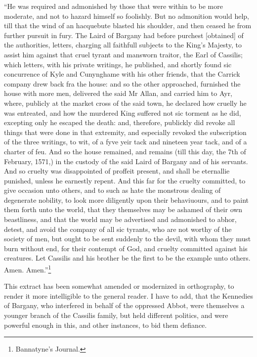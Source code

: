 ``He was required and admonished by those that were within to be more
moderate, and not to hazard himself so foolishly. But no admonition
would help, till that the wind of an hacquebute blasted his shoulder,
and then ceased he from further pursuit in fury. The Laird of Bargany
had before purchest {[}obtained{]} of the authorities, letters, charging
all faithfull subjects to the King's Majesty, to assist him against that
cruel tyrant and mansworn traitor, the Earl of Cassilis; which letters,
with his private writings, he published, and shortly found sic
concurrence of Kyle and Cunynghame with his other friends, that the
Carrick company drew back fra the house: and so the other approached,
furnished the house with more men, delivered the said Mr Allan, and
carried him to Ayr, where, publicly at the market cross of the said
town, he declared how cruelly he was entreated, and how the murdered
King suffered not sic torment as he did, excepting only he escaped the
death: and, therefore, publickly did revoke all things that were done in
that extremity, and especially revoked the subscription of the three
writings, to wit, of a fyve yeir tack and nineteen year tack, and of a
charter of feu. And so the house remained, and remains (till this day,
the 7th of February, 1571,) in the custody of the said Laird of Bargany
and of his servants. And so cruelty was disappointed of proffeit
present, and shall be eternallie punished, unless he earnestly repent.
And this far for the cruelty committed, to give occasion unto others,
and to such as hate the monstrous dealing of degenerate nobility, to
look more diligently upon their behaviuours, and to paint them forth
unto the world, that they themselves may be ashamed of their own
beastliness, and that the world may be advertised and admonished to
abhor, detest, and avoid the company of all sic tyrants, who are not
worthy of the society of men, but ought to be sent suddenly to the
devil, with whom they must burn without end, for their contempt of God,
and cruelty committed against his creatures. Let Cassilis and his
brother be the first to be the example unto others. Amen.
Amen.''\footnote{Bannatyne's Journal.}

This extract has been somewhat amended or modernized in orthography, to
render it more intelligible to the general reader. I have to add, that
the Kennedies of Bargany, who interfered in behalf of the oppressed
Abbot, were themselves a younger branch of the Cassilis family, but held
different politics, and were powerful enough in this, and other
instances, to bid them defiance.

